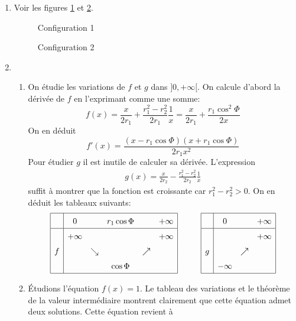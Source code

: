 \begin{enumerate}
\item Voir les figures \ref{Cplanicom_1} et \ref{Cplanicom_2}.
\begin{figure}[h!t]
 \centering
 
 \caption{Configuration 1}
 \label{Cplanicom_1}
\end{figure}
\begin{figure}[h!t]
 \centering
 
 \caption{Configuration 2}
 \label{Cplanicom_2}
\end{figure}

\item \begin{enumerate}
\item On étudie les variations de $f$ et $g$ dans $]0,+\infty[$.\newline
On calcule d'abord la dérivée de $f$ en l'exprimant comme une somme:
\[
f(x)=\frac{x}{2r_1}+\frac{r_1^2-r_2^2}{2r_1}\frac{1}{x}=
\frac{x}{2r_1}+\frac{r_1 \cos^2\Phi}{2x}
\]
On en déduit
\[
f'(x) = \frac{(x-r_1\cos \Phi)(x+r_1\cos \Phi)}{2r_1x^2}
\]
Pour étudier $g$ il est inutile de calculer sa dérivée. L'expression
\begin{align*}
 g(x)=\frac{x}{2r_2}-\frac{r_1^2-r_2^2}{2r_2}\frac{1}{x}
\end{align*}
suffit à montrer que la fonction est croissante car $r_1^2-r_2^2>0$. On en déduit les tableaux suivants:
\begin{displaymath}
\renewcommand{\arraystretch}{1.5}
\begin{array}{|c|ccccc|}
\hline & 0 &  & r_1 \cos \Phi &  & +\infty \\ 
\hline & + \infty &  &  &  & +\infty \\ 
f &  & \searrow &  & \nearrow &  \\ 
 &  &  & \cos \Phi &  & \\ \hline
\end{array}
\hspace{1cm}
\begin{array}{|c|ccc|}
\hline & 0 &    & +\infty \\ 
\hline & &   & +\infty \\ 
g &    & \nearrow &  \\ 
 & -\infty  &  & \\ \hline
\end{array} 
\end{displaymath}
\item \'Etudions l'équation $f(x)=1$. Le tableau des variations et le théorème de la valeur intermédiaire montrent clairement que cette équation admet deux solutions. Cette équation revient à 

\end{enumerate}
\end{enumerate}
